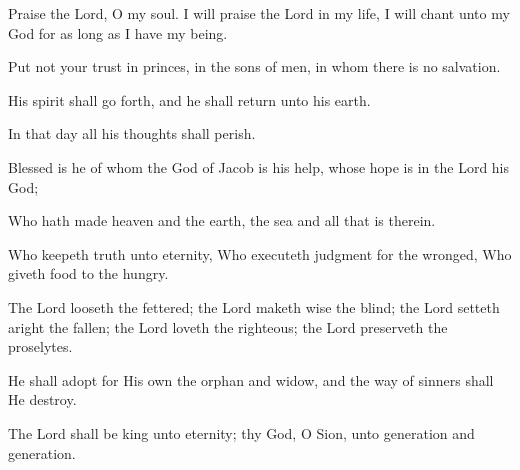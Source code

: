 Praise the Lord, O my soul. I will praise the Lord in my life, I will chant unto my God for as long as I have my being.

Put not your trust in princes, in the sons of men, in whom there is no salvation.

His spirit shall go forth, and he shall return unto his earth.

In that day all his thoughts shall perish.

Blessed is he of whom the God of Jacob is his help, whose hope is in the Lord his God;

Who hath made heaven and the earth, the sea and all that is therein.

Who keepeth truth unto eternity, Who executeth judgment for the wronged, Who giveth food to the hungry.

The Lord looseth the fettered; the Lord maketh wise the blind; the Lord setteth aright the fallen; the Lord loveth the righteous; the Lord preserveth the proselytes.

He shall adopt for His own the orphan and widow, and the way of sinners shall He destroy.

The Lord shall be king unto eternity; thy God, O Sion, unto generation and generation.
